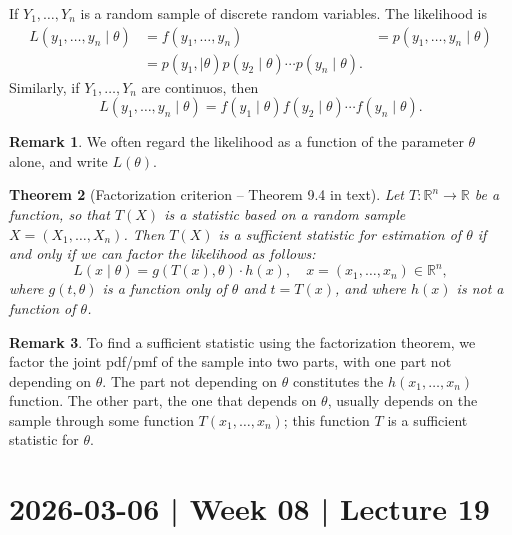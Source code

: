 \documentclass[10pt]{article}
\newtheorem{theorem}{Theorem}
\theoremstyle{definition}
\newtheorem{remark}[theorem]{Remark}
\newcommand{\1}[1]{\textbf{1}_{\left[#1\right]}} %
\def\R{\mathbb{R}} %
\begin{document}
If $Y_{1},\ldots,Y_{n}$ is a random sample of discrete random variables. The
likelihood is
\begin{align*}
  L(y_{1},\ldots,y_{n}\mid \theta)
  &= f(y_{1},\ldots,y_{n})
  &= p(y_{1},\ldots,y_{n}\mid \theta)\\
  &= p(y_{1},\mid \theta) p(y_{2}\mid \theta) \cdots p(y_{n}\mid \theta).
\end{align*}
Similarly, if $Y_{1},\ldots,Y_{n}$ are continuos, then
\begin{equation*}
  L(y_{1},\ldots,y_{n}\mid \theta) = f(y_{1}\mid \theta) f(y_{2}\mid \theta) \cdots f(y_{n}\mid \theta).
\end{equation*}

\begin{remark}
  We often regard the likelihood as a function of the parameter $\theta$
  alone, and write $L(\theta)$.
\end{remark}


\begin{theorem}[Factorization criterion -- Theorem 9.4 in text]
  \label{thm:factorization-criterion-for-sufficiency}
  Let $T:\R^{n}\to \R$ be a function, so that $T(X)$ is a statistic based on a
  random sample $X=(X_{1},\ldots,X_{n})$. Then $T(X)$ is a sufficient
  statistic for estimation of $\theta$ if and only if we can factor the
  likelihood as follows:
  \begin{equation*}
    L(x\mid \theta) = g(T(x),\theta)\cdot h(x), \quad x=(x_{1},\ldots,x_{n})\in \R^{n},
  \end{equation*}
  where $g(t,\theta)$ is a function only of $\theta$ and $t=T(x)$, and where
  $h(x)$ is not a function of $\theta$.
\end{theorem}

\begin{remark}
  To find a sufficient statistic using the factorization theorem, we factor
  the joint pdf/pmf of the sample into two parts, with one part not depending
  on $\theta$. The part not depending on $\theta$ constitutes the
  $h(x_{1},\ldots,x_{n})$ function. The other part, the one that depends on
  $\theta$, usually depends on the sample through some function
  $T(x_{1},\ldots,x_{n})$; this function $T$ is a sufficient statistic for $\theta$.
\end{remark}


\newpage
\section{2026-03-06 | Week 08 | Lecture 19}
\end{document}
